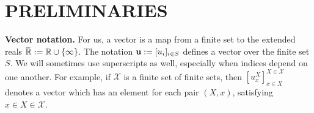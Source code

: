 \documentclass[twoside]{article}
\begin{document}
\section{PRELIMINARIES}

\textbf{Vector notation.}
For us, a vector is a map from a finite set to the extended reals
    $\mskip1mu\overline{\mskip-1mu\mathbb R\!}\, := \mathbb R \cup \{\infty\}$. 
The notation $\mathbf{u} := [u_i]_{i \in S}$ defines a vector over the finite set $S$.
We will sometimes use superscripts as well, especially when indices depend on one another. For example, if $\mathcal X$ is a finite set of finite sets, then
$[u^X_x]^{X \in \mathcal X}_{x \in X}$ denotes a vector which has an element
for each pair $(X,x)$, satisfying $x \in X \in \mathcal X$.
\end{document}
